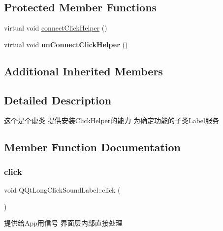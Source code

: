 \subsection*{Protected Member Functions}
\begin{DoxyCompactItemize}
\item 
virtual void \mbox{\hyperlink{class_q_qt_long_click_sound_label_a8aed0ec65ec8c51cdc1cceb7c1b115c2}{connect\+Click\+Helper}} ()
\item 
\mbox{\label{class_q_qt_long_click_sound_label_a0cf301c945fe06f8c9985e72b8ad8d26}} 
virtual void {\bfseries un\+Connect\+Click\+Helper} ()
\end{DoxyCompactItemize}
\subsection*{Additional Inherited Members}


\subsection{Detailed Description}
这个是个虚类 提供安装\+Click\+Helper的能力 为确定功能的子类\+Label服务 

\subsection{Member Function Documentation}
\mbox{\label{class_q_qt_long_click_sound_label_a0992a811265c8b923eba517f790b4308}} 
\subsubsection{\texorpdfstring{click}{click}}
{\footnotesize\ttfamily void Q\+Qt\+Long\+Click\+Sound\+Label\+::click (\begin{DoxyParamCaption}{ }\end{DoxyParamCaption})\hspace{0.3cm}{\ttfamily [signal]}}

提供给\+App用信号 界面层内部直接处理 \mbox{\label{class_q_qt_long_click_sound_label_a8aed0ec65ec8c51cdc1cceb7c1b115c2}} 
